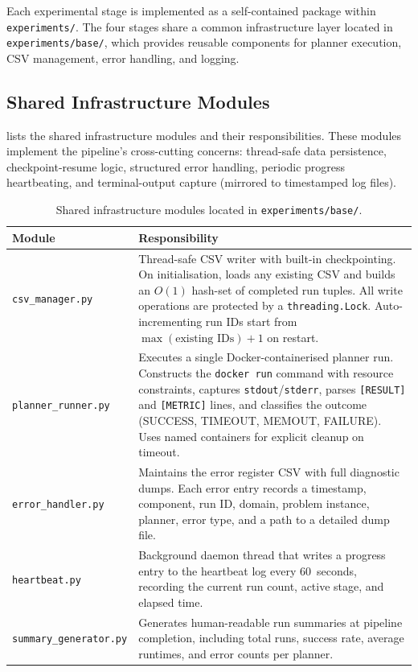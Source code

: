 Each experimental stage is implemented as a self-contained package within \texttt{experiments/}.
The four stages share a common infrastructure layer located in \texttt{experiments/base/}, which provides reusable components for planner execution, CSV management, error handling, and logging.

\subsection{Shared Infrastructure Modules}
\label{sec:impl:codebase:infra}

 lists the shared infrastructure modules and their responsibilities.
These modules implement the pipeline's cross-cutting concerns: thread-safe data persistence, checkpoint-resume logic, structured error handling, periodic progress heartbeating, and terminal-output capture (mirrored to timestamped log files).

\begin{table}[!htbp]
  \centering
  \caption{Shared infrastructure modules located in \texttt{experiments/base/}.}
  \label{tab:shared_modules}
  \small
  \begin{tabular}{l p{8.5cm}}
    \toprule
    \textbf{Module} & \textbf{Responsibility} \\
    \midrule
    \texttt{csv\_manager.py} & Thread-safe CSV writer with built-in checkpointing. On initialisation, loads any existing CSV and builds an $O(1)$ hash-set of completed run tuples. All write operations are protected by a \texttt{threading.Lock}. Auto-incrementing run IDs start from $\max(\text{existing IDs}) + 1$ on restart. \\[4pt]
    \texttt{planner\_runner.py} & Executes a single Docker-containerised planner run. Constructs the \texttt{docker run} command with resource constraints, captures \texttt{stdout}/\texttt{stderr}, parses \texttt{[RESULT]} and \texttt{[METRIC]} lines, and classifies the outcome (SUCCESS, TIMEOUT, MEMOUT, FAILURE). Uses named containers for explicit cleanup on timeout. \\[4pt]
    \texttt{error\_handler.py} & Maintains the error register CSV with full diagnostic dumps. Each error entry records a timestamp, component, run ID, domain, problem instance, planner, error type, and a path to a detailed dump file. \\[4pt]
    \texttt{heartbeat.py} & Background daemon thread that writes a progress entry to the heartbeat log every 60~seconds, recording the current run count, active stage, and elapsed time. \\[4pt]
    \texttt{summary\_generator.py} & Generates human-readable run summaries at pipeline completion, including total runs, success rate, average runtimes, and error counts per planner. \\
    \bottomrule
  \end{tabular}
\end{table}

